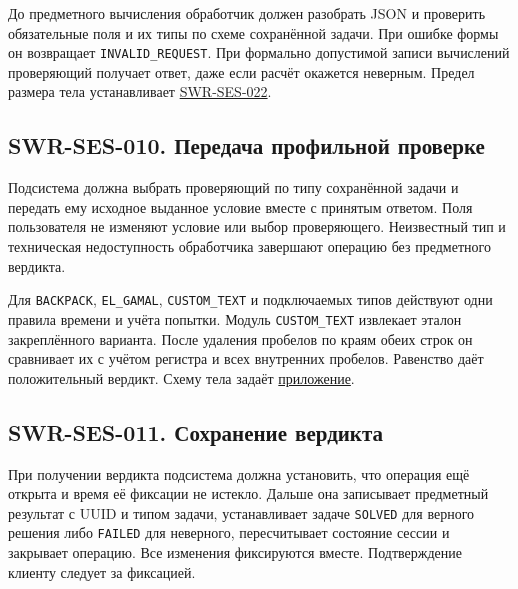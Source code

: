\documentclass[12pt,a4paper]{article}
\begin{document}
\hypertarget{swr-ses-009}{}

До предметного вычисления обработчик должен разобрать JSON и проверить обязательные поля и их типы по схеме сохранённой задачи. При ошибке формы он возвращает \texttt{INVALID\_\allowbreak{}REQUEST}. При формально допустимой записи вычислений проверяющий получает ответ, даже если расчёт окажется неверным. Предел размера тела устанавливает {\hyperlink{swr-ses-022}{SWR-SES-022}}.

\subsection{SWR-SES-010. Передача профильной проверке}\label{swr-ses-010-ux43fux435ux440ux435ux434ux430ux447ux430-ux43fux440ux43eux444ux438ux43bux44cux43dux43eux439-ux43fux440ux43eux432ux435ux440ux43aux435}

\hypertarget{swr-ses-010-передача-профильной-проверке}{}

\hypertarget{swr-ses-010}{}

Подсистема должна выбрать проверяющий по типу сохранённой задачи и передать ему исходное выданное условие вместе с принятым ответом. Поля пользователя не изменяют условие или выбор проверяющего. Неизвестный тип и техническая недоступность обработчика завершают операцию без предметного вердикта.

Для \texttt{BACKPACK}, \texttt{EL\_GAMAL}, \texttt{CUSTOM\_\allowbreak{}TEXT} и подключаемых типов действуют одни правила времени и учёта попытки. Модуль \texttt{CUSTOM\_\allowbreak{}TEXT} извлекает эталон закреплённого варианта. После удаления пробелов по краям обеих строк он сравнивает их с учётом регистра и всех внутренних пробелов. Равенство даёт положительный вердикт. Схему тела задаёт {\hyperlink{пользовательское-текстовое-задание}{приложение}}.

\subsection{SWR-SES-011. Сохранение вердикта}\label{swr-ses-011-ux441ux43eux445ux440ux430ux43dux435ux43dux438ux435-ux432ux435ux440ux434ux438ux43aux442ux430}

\hypertarget{swr-ses-011-сохранение-вердикта}{}

\hypertarget{swr-ses-011}{}

При получении вердикта подсистема должна установить, что операция ещё открыта и время её фиксации не истекло. Дальше она записывает предметный результат с UUID и типом задачи, устанавливает задаче \texttt{SOLVED} для верного решения либо \texttt{FAILED} для неверного, пересчитывает состояние сессии и закрывает операцию. Все изменения фиксируются вместе. Подтверждение клиенту следует за фиксацией.
\end{document}

